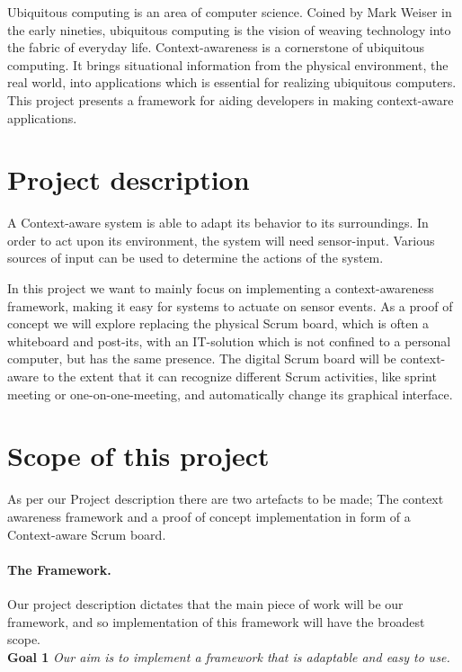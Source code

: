 \documentclass[../report.tex]{subfiles}
\begin{document}
\graphicspath{{img/}{../img/}}
Ubiquitous computing is an area of computer science. Coined by Mark Weiser in the early nineties, ubiquitous computing is the vision of weaving technology into the fabric of everyday life. Context-awareness is a cornerstone of ubiquitous computing. It brings situational information from the physical environment, the real world, into applications which is essential for realizing ubiquitous computers. This project presents a framework for aiding developers in making context-aware applications.

\section{Project description}
A Context-aware system is able to adapt its behavior to its surroundings. In order to act upon its environment, the system will need sensor-input. Various sources of input can be used to determine the actions of the system.

In this project we want to mainly focus on implementing a context-awareness framework, making it easy for systems to actuate on sensor events. As a proof of concept we will explore replacing the physical Scrum board, which is often a whiteboard and post-its, with an IT-solution which is not confined to a personal computer, but has the same presence. The digital Scrum board will be context-aware to the extent that it can recognize different Scrum activities, like sprint meeting or one-on-one-meeting, and automatically change its graphical interface.


\section{Scope of this project}
\label{scope}

As per our Project description there are two artefacts to be made; The context awareness framework and a proof of concept implementation in form of a Context-aware Scrum board.

\paragraph{The Framework.} 
Our project description dictates that the main piece of work will be our framework, and so implementation of this framework will have the broadest scope.\\

\textbf{Goal 1} \textit{Our aim is to implement a framework that is adaptable and easy to use.}
\end{document}
